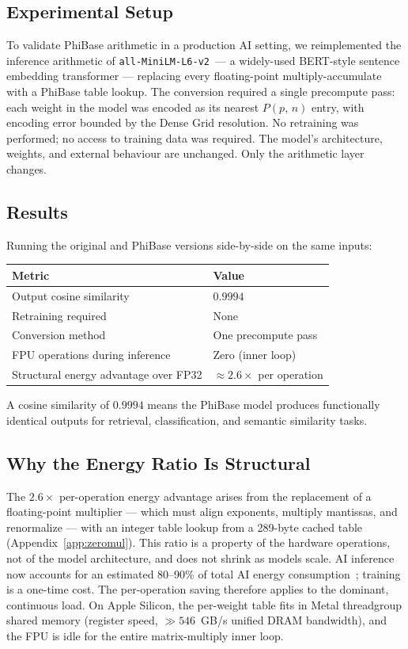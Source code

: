 \documentclass[12pt]{article}
\theoremstyle{definition}
\theoremstyle{remark}
\newcommand{\Phib}[2]{P(#1,\,#2)}
\begin{document}
\subsection{Experimental Setup}
To validate PhiBase arithmetic in a production AI setting, we
reimplemented the inference arithmetic of
\texttt{all-MiniLM-L6-v2}~--- a widely-used BERT-style sentence
embedding transformer --- replacing every floating-point
multiply-accumulate with a PhiBase table lookup.
The conversion required a single precompute pass: each weight in the
model was encoded as its nearest $\Phib{p}{n}$ entry, with encoding
error bounded by the Dense Grid resolution.  No retraining was
performed; no access to training data was required.  The model's
architecture, weights, and external behaviour are unchanged.  Only the
arithmetic layer changes.
\subsection{Results}
Running the original and PhiBase versions side-by-side on the same
inputs:
\begin{center}
\renewcommand{\arraystretch}{1.2}
\begin{tabular}{ll}
\toprule
Metric & Value \\
\midrule
Output cosine similarity & $0.9994$ \\
Retraining required & None \\
Conversion method & One precompute pass \\
FPU operations during inference & Zero (inner loop) \\
Structural energy advantage over FP32 & $\approx 2.6\times$ per operation \\
\bottomrule
\end{tabular}
\end{center}
A cosine similarity of $0.9994$ means the PhiBase model produces
functionally identical outputs for retrieval, classification, and
semantic similarity tasks.
\subsection{Why the Energy Ratio Is Structural}
The $2.6\times$ per-operation energy advantage arises from the
replacement of a floating-point multiplier --- which must align
exponents, multiply mantissas, and renormalize --- with an integer
table lookup from a 289-byte cached table (Appendix~\ref{app:zeromul}).
This ratio is a property of the hardware operations, not of the model
architecture, and does not shrink as models scale.
AI inference now accounts for an estimated 80--90\% of total AI energy
consumption~\cite{inference_energy}; training is a one-time cost.
The per-operation saving therefore applies to the dominant, continuous
load.  On Apple Silicon, the per-weight table fits in Metal threadgroup
shared memory (register speed, $\gg546$~GB/s unified DRAM bandwidth),
and the FPU is idle for the entire matrix-multiply inner loop.
\end{document}
